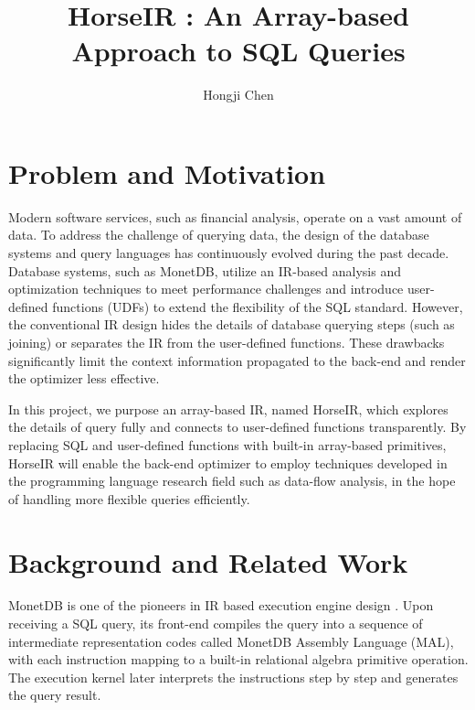 \documentclass[sigplan]{acmart}
\begin{document}
\title{HorseIR : An Array-based Approach to SQL Queries}

\author{Hongji Chen}

\maketitle

\section{Problem and Motivation}

Modern software services, such as financial analysis, operate on a vast amount
of data. To address the challenge of querying data, the design of the database
systems and query languages has continuously evolved during the past decade.
Database systems, such as MonetDB\cite{MonetDBHome}, utilize an IR-based
analysis and optimization techniques to meet performance challenges and
introduce user-defined functions (UDFs) to extend the flexibility of the SQL
standard.  However, the conventional IR design hides the details of database
querying steps (such as joining) or separates the IR from the user-defined
functions. These drawbacks significantly limit the context information
propagated to the back-end and render the optimizer less effective.

In this project, we purpose an array-based IR, named HorseIR, which explores
the details of query fully and connects to user-defined functions
transparently. By replacing SQL and user-defined functions with built-in
array-based primitives, HorseIR will enable the back-end optimizer to employ
techniques developed in the programming language research field such as
data-flow analysis, in the hope of handling more flexible queries efficiently.


\section{Background and Related Work}

MonetDB is one of the pioneers in IR based execution engine design
\cite{DBLP:journals/debu/IdreosGNMMK12}. Upon receiving a SQL query, its
front-end compiles the query into a sequence of intermediate representation
codes called MonetDB Assembly Language (MAL), with each instruction mapping to
a built-in relational algebra primitive operation. The execution kernel later
interprets the instructions step by step and generates the query result.
\end{document}
